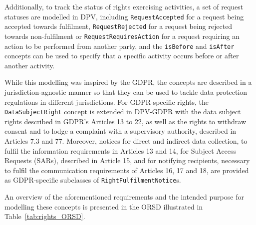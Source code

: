 Additionally, to track the status of rights exercising activities, a set of request statuses are modelled in DPV, including \texttt{RequestAccepted} for a request being accepted towards fulfilment, \texttt{RequestRejected} for a request being rejected towards non-fulfilment or \texttt{RequestRequiresAction} for a request requiring an action to be performed from another party, and the \texttt{isBefore} and \texttt{isAfter} concepts can be used to specify that a specific activity occurs before or after another activity.

While this modelling was inspired by the GDPR, the concepts are described in a jurisdiction-agnostic manner so that they can be used to tackle data protection regulations in different jurisdictions.
For GDPR-specific rights, the \texttt{DataSubjectRight} concept is extended in DPV-GDPR with the data subject rights described in GDPR's Articles 13 to 22, as well as the rights to withdraw consent and to lodge a complaint with a supervisory authority, described in Articles 7.3 and 77.
Moreover, notices for direct and indirect data collection, to fulfil the information requirements in Articles 13 and 14, for Subject Access Requests (SARs), described in Article 15, and for notifying recipients, necessary to fulfil the communication requirements of Articles 16, 17 and 18, are provided as GDPR-specific subclasses of \texttt{RightFulfilmentNotice}s.

An overview of the aforementioned requirements and the intended purpose for modelling these concepts is presented in the ORSD illustrated in Table~\ref{tab:rights_ORSD}.

